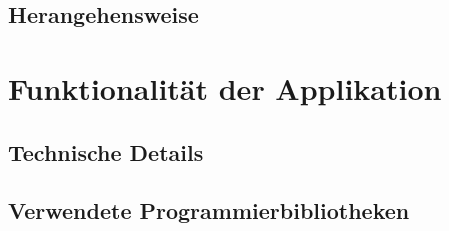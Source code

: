 \documentclass[10pt]{scrartcl}
\begin{document}
\subsection{Herangehensweise}

\section{Funktionalität der Applikation}


\subsection{Technische Details}

\subsection{Verwendete Programmierbibliotheken}
\end{document}
